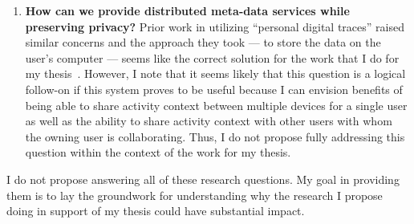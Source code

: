 \begin{enumerate}
    \item \label{rq:privacy} \textbf{How can we provide distributed meta-data services while
              preserving privacy?} Prior work in utilizing ``personal digital traces''
          raised similar concerns and the approach they took --- to store the data on
          the user's computer --- seems like the correct solution for the work that I
          do for my thesis~\cite{vianna2019searching}.  However, I note that it seems
          likely that this question is a logical follow-on if this system proves to be
          useful because I can envision benefits of being able to share activity
          context between multiple devices for a single user as well as the ability to
          share activity context with other users with whom the owning user is
          collaborating.  Thus, I do not propose fully addressing this question within the
          context of the work for my thesis.

\end{enumerate}

I do not propose answering all of these research questions.  My goal in
providing them is to lay the groundwork for understanding why the research I
propose doing in support of my thesis could have substantial impact.
